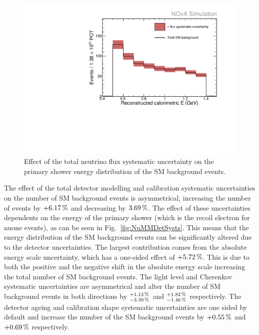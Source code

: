 \begin{figure}[hbtp]
\centering
\includegraphics[width=.9\textwidth]{Plots/NuMM/SystShifts_beamSysts_Full_Graph.pdf}
\caption[Neutrino flux systematic uncertainty]{Effect of the total neutrino flux systematic uncertainty on the primary shower energy distribution of the \acrshort{SM} background events.}
\label{fig:NuMMFluxSysts}
\end{figure}

The effect of the total detector modelling and calibration systematic uncertainties on the number of \gls{SM} background events is asymmetrical, increasing the number of events by $+\unit[6.17]{\%}$ and decreasing by $\unit[3.69]{\%}$. The effect of these uncertainties dependents on the energy of the primary shower (which is the recoil electron for \gls{nuone} events), as can be seen in Fig.~\ref{fig:NuMMDetSysts}. This means that the energy distribution of the \gls{SM} background events can be significantly altered due to the detector uncertainties. The largest contribution comes from the absolute energy scale uncertainty, which has a one-sided effect of $\unit[+5.72]{\%}$. This is due to both the positive and the negative shift in the absolute energy scale increasing the total number of \gls{SM} background events. The light level and  Cherenkov systematic uncertainties are asymmetrical and alter the number of \gls{SM} background events in both directions by $^{+\unit[1.13]{\%}}_{\unit[-3.39]{\%}}$ and $^{\unit[+1.82]{\%}}_{\unit[-1.46]{\%}}$ respectively. The detector ageing and calibration shape systematic uncertainties are one sided by default and increase the number of the \gls{SM} background events by $\unit[+0.55]{\%}$ and $\unit[+0.69]{\%}$ respectively.

